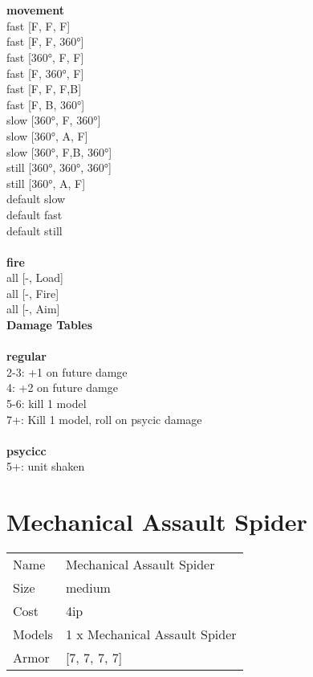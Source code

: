  
\ \\




\ \\ {\bf movement } \\
fast [F, F, F] \\
fast [F, F, 360°] \\
fast [360°, F, F] \\
fast [F, 360°, F] \\
fast [F, F, F,B] \\
fast [F, B, 360°] \\
slow [360°, F, 360°] \\
slow [360°, A, F] \\
slow [360°, F,B, 360°] \\
still [360°, 360°, 360°] \\
still [360°, A, F] \\
default slow \\
default fast \\
default still \\
\ \\ {\bf fire } \\
all [-, Load] \\
all [-, Fire] \\
all [-, Aim] \\


{\bf Damage Tables} \\
\ \\ {\bf regular } \\
2-3: +1 on future damge \\
4: +2 on future damge \\
5-6: kill 1 model \\
7+: Kill 1 model, roll on psycic damage \\
\ \\ {\bf psycicc } \\
5+: unit shaken \\










\pagebreak\pagebreak

\section{ Mechanical Assault Spider }

\begin{tabular}{ll}
  Name & Mechanical Assault Spider \\
  Size & medium\\
  Cost & 4ip\\
  Models & 1 x Mechanical Assault Spider\\
  Armor & [7, 7, 7, 7]\\
\end{tabular}

